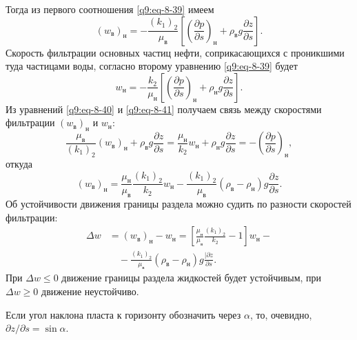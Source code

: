 Тогда из первого соотношения \eqref{q9:eq-8-39} имеем
\begin{equation}(w_\text{в})_\text{н}=-\frac{(k_1)_2}{\mu_\text{в}}\left[\left(\frac{\partial p}{\partial s}\right)_\text{н}+\rho_\text{в}g\frac{\partial z}{\partial s}\right].\tag{8.40}\label{q9:eq-8-40}\end{equation}
Скорость фильтрации основных частиц нефти, соприкасающихся с проникшими туда частицами воды, согласно второму уравнению \eqref{q9:eq-8-39} будет
\begin{equation}w_\text{н}=-\frac{k_2}{\mu_\text{н}}\left[\left(\frac{\partial p}{\partial s}\right)_\text{н}+\rho_\text{н}g\frac{\partial z}{\partial s}\right].\tag{8.41}\label{q9:eq-8-41}\end{equation}
Из уравнений \eqref{q9:eq-8-40} и \eqref{q9:eq-8-41} получаем связь между скоростями фильтрации $(w_\text{в})_\text{н}$ и $w_\text{н}$:
\[
\frac{\mu_\text{в}}{(k_1)_2}(w_\text{в})_\text{н}+\rho_\text{в}g\frac{\partial z}{\partial s}=\frac{\mu_\text{н}}{k_2}w_\text{н}+\rho_\text{н}g\frac{\partial z}{\partial s}=-\left(\frac{\partial p}{\partial s}\right)_\text{н},
\]
откуда
\[
(w_\text{в})_\text{н}=\frac{\mu_\text{н}}{\mu_\text{в}}\frac{(k_1)_2}{k_2}w_\text{н}-\frac{(k_1)_2}{\mu_\text{в}}(\rho_\text{в}-\rho_\text{н})g\frac{\partial z}{\partial s}.
\]
Об устойчивости движения границы раздела можно судить по разности скоростей фильтрации:
\begin{equation}\begin{aligned}
\Delta w&=(w_\text{в})_\text{н}-w_\text{н}=\left[\frac{\mu_\text{н}}{\mu_\text{в}}\frac{(k_1)_2}{k_2}-1\right]w_\text{н}-\\
&\quad-\frac{(k_1)_2}{\mu_\text{в}}(\rho_\text{в}-\rho_\text{н})g\frac{\vert\partial z}{\partial s}.
\end{aligned}\tag{8.42}\label{q9:eq-8-42}\end{equation}
При $\Delta w\le0$ движение границы раздела жидкостей будет устойчивым, при $\Delta w\ge0$ движение неустойчиво.

Если угол наклона пласта к горизонту обозначить через $\alpha$, то, очевидно, $\partial z/\partial s=\sin\alpha$.

